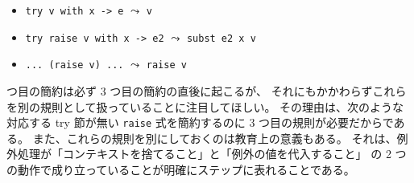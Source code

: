 \begin{itemize}
  \item \texttt{try v with x -> e} $\leadsto$ \texttt{v}
  \item \texttt{try raise v with x -> e2} $\leadsto$ \texttt{subst e2 x v}
  \item \texttt{...\ (raise v) ...} $\leadsto$ \texttt{raise v}
\end{itemize}

 つ目の簡約は必ず 3 つ目の簡約の直後に起こるが、
それにもかかわらずこれらを別の規則として扱っていることに注目してほしい。
その理由は、次のような対応する try 節が無い \texttt{raise} 式を簡約するのに 3 つ目の規則が必要だからである。
また、これらの規則を別にしておくのは教育上の意義もある。
それは、例外処理が「コンテキストを捨てること」と「例外の値を代入すること」
の 2 つの動作で成り立っていることが明確にステップに表れることである。


